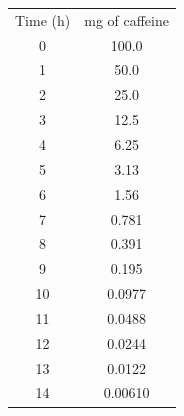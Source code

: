 \documentclass[12pt]{article}
\begin{document}
                \begin{center}
                        \begin{tabular}{cc}
                        Time (h) & mg of caffeine       \\
                        0 & 100.0\\ 
                        1 & 50.0  \\ 
                        2 & 25.0   \\
                        3 & 12.5    \\ 
                        4 & 6.25     \\ 
                        5 & 3.13      \\ 
                        6 & 1.56       \\
                        7 & 0.781       \\
                        8 & 0.391        \\
                        9 & 0.195         \\ 
                        10 & 0.0977        \\ 
                        11 & 0.0488         \\ 
                        12 & 0.0244          \\ 
                        13 & 0.0122           \\
                        14 & 0.00610           \\
                        
                                           
                        \end{tabular}
                        
                \end{center}
                
                
        
\end{document}
